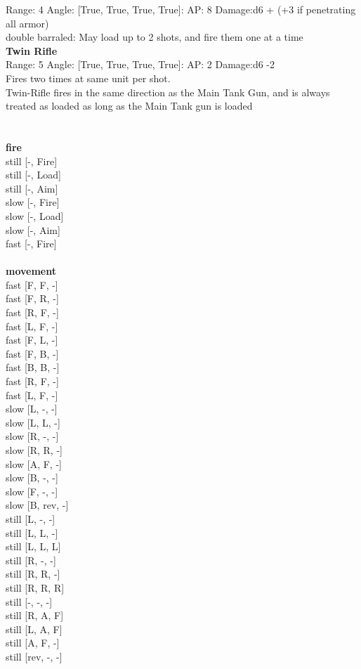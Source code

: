 Range: 4  Angle: [True, True, True, True]: AP: 8 Damage:d6 + (+3 if penetrating all armor) \\
double barraled: May load up to 2 shots, and fire them one at a time\\ 




{\bf Twin Rifle } \\



Range: 5  Angle: [True, True, True, True]: AP: 2 Damage:d6 -2 \\
Fires two times at same unit per shot.\\Twin-Rifle fires in the same direction as the Main Tank Gun, and is always treated as loaded as long as the Main Tank gun is loaded\\ 




 
\ \\



\ \\ {\bf fire } \\
still [-, Fire] \\
still [-, Load] \\
still [-, Aim] \\
slow [-, Fire] \\
slow [-, Load] \\
slow [-, Aim] \\
fast [-, Fire] \\
\ \\ {\bf movement } \\
fast [F, F, -] \\
fast [F, R, -] \\
fast [R, F, -] \\
fast [L, F, -] \\
fast [F, L, -] \\
fast [F, B, -] \\
fast [B, B, -] \\
fast [R, F, -] \\
fast [L, F, -] \\
slow [L, -, -] \\
slow [L, L, -] \\
slow [R, -, -] \\
slow [R, R, -] \\
slow [A, F, -] \\
slow [B, -, -] \\
slow [F, -, -] \\
slow [B, rev, -] \\
still [L, -, -] \\
still [L, L, -] \\
still [L, L, L] \\
still [R, -, -] \\
still [R, R, -] \\
still [R, R, R] \\
still [-, -, -] \\
still [R, A, F] \\
still [L, A, F] \\
still [A, F, -] \\
still [rev, -, -] \\



